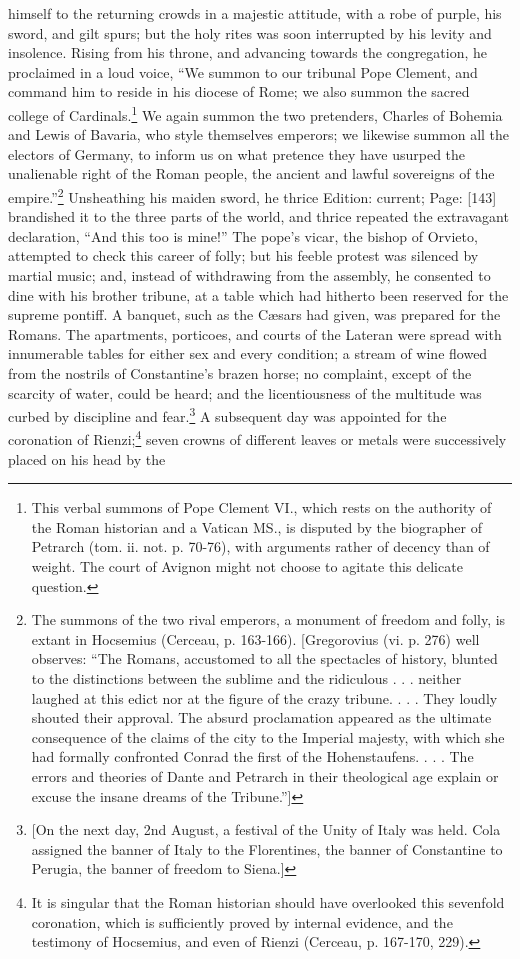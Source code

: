 himself to the returning crowds in a majestic attitude, with a robe of purple, his sword, and gilt spurs; but the holy rites was soon interrupted by his levity and insolence. Rising from his throne, and advancing towards the congregation, he proclaimed in a loud voice, \texthebrew{“}We summon to our tribunal Pope Clement, and command him to reside in his diocese of Rome; we also summon the sacred college of Cardinals.\footnote{This verbal summons of Pope Clement VI., which rests on the authority of the Roman historian and a Vatican MS., is disputed by the biographer of Petrarch (tom. ii. not. p. 70-76), with arguments rather of decency than of weight. The court of Avignon might not choose to agitate this delicate question.} We again summon the two pretenders, Charles of Bohemia and Lewis of Bavaria, who style themselves emperors; we likewise summon all the electors of Germany, to inform us on what pretence they have usurped the unalienable right of the Roman people, the ancient and lawful sovereigns of the empire.\texthebrew{}”\footnote{The summons of the two rival emperors, a monument of freedom and folly, is extant in Hocsemius (Cerceau, p. 163-166). [Gregorovius (vi. p. 276) well observes: \texthebrew{“}The Romans, accustomed to all the spectacles of history, blunted to the distinctions between the sublime and the ridiculous . . . neither laughed at this edict nor at the figure of the crazy tribune. . . . They loudly shouted their approval. The absurd proclamation appeared as the ultimate consequence of the claims of the city to the Imperial majesty, with which she had formally confronted Conrad the first of the Hohenstaufens. . . . The errors and theories of Dante and Petrarch in their theological age explain or excuse the insane dreams of the Tribune.\texthebrew{}”]} Unsheathing his maiden sword, he thrice Edition: current; Page: [143] brandished it to the three parts of the world, and thrice repeated the extravagant declaration, \texthebrew{“}And this too is mine!\texthebrew{}” The pope\texthebrew{}’s vicar, the bishop of Orvieto, attempted to check this career of folly; but his feeble protest was silenced by martial music; and, instead of withdrawing from the assembly, he consented to dine with his brother tribune, at a table which had hitherto been reserved for the supreme pontiff. A banquet, such as the Cæsars had given, was prepared for the Romans. The apartments, porticoes, and courts of the Lateran were spread with innumerable tables for either sex and every condition; a stream of wine flowed from the nostrils of Constantine\texthebrew{}’s brazen horse; no complaint, except of the scarcity of water, could be heard; and the licentiousness of the multitude was curbed by discipline and fear.\footnote{[On the next day, 2nd August, a festival of the Unity of Italy was held. Cola assigned the banner of Italy to the Florentines, the banner of Constantine to Perugia, the banner of freedom to Siena.]} A subsequent day was appointed for the coronation of Rienzi;\footnote{It is singular that the Roman historian should have overlooked this sevenfold coronation, which is sufficiently proved by internal evidence, and the testimony of Hocsemius, and even of Rienzi (Cerceau, p. 167-170, 229).} seven crowns of different leaves or metals were successively placed on his head by the 